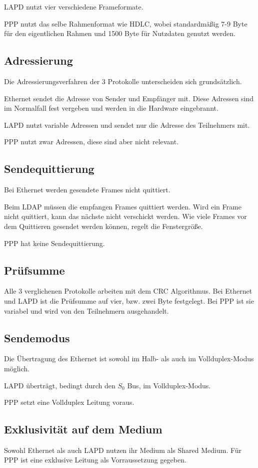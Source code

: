 \documentclass[12pt, a4paper, ngerman]{article}
\begin{document}
LAPD nutzt vier verschiedene Frameformate. 

PPP nutzt das selbe Rahmenformat wie HDLC, wobei standardmäßig 7-9 Byte für den eigentlichen Rahmen und 1500 Byte für Nutzdaten genutzt werden.
\subsection{Adressierung}
Die Adressierungsverfahren der 3 Protokolle unterscheiden sich grund\-sätz\-lich. 

Ethernet sendet die Adresse von Sender und Empfänger mit. Diese Adressen sind im Normalfall fest vergeben und werden in die Hardware eingebrannt.

LAPD nutzt variable Adressen und sendet nur die Adresse des Teilnehmers mit.

PPP nutzt zwar Adressen, diese sind aber nicht relevant.

\subsection{Sendequittierung}
Bei Ethernet werden gesendete Frames nicht quittiert. 

Beim LDAP müssen die empfangen Frames quittiert werden. Wird ein Frame nicht quittiert, kann das nächste nicht verschickt werden. Wie viele Frames vor dem Quittieren gesendet werden können, regelt die Fenstergröße.

PPP hat keine Sendequittierung.

\subsection{Prüfsumme} 
Alle 3 verglichenen Protokolle arbeiten mit dem CRC Algorithmus. Bei Ethernet und LAPD ist die Prüfsumme auf vier, bzw. zwei Byte festgelegt. Bei PPP ist sie variabel und wird von den Teilnehmern ausgehandelt. 

\subsection{Sendemodus}
Die Übertragung des Ethernet ist sowohl im Halb- als auch im Vollduplex-Modus möglich. 

LAPD überträgt, bedingt durch den $S_0$ Bus, im Vollduplex-Modus.

PPP setzt eine Vollduplex Leitung voraus.

\subsection{Exklusivität auf dem Medium}
Sowohl Ethernet als auch LAPD nutzen ihr Medium als Shared Medium.
Für PPP ist eine exklusive Leitung als Vorraussetzung gegeben.
\end{document}
